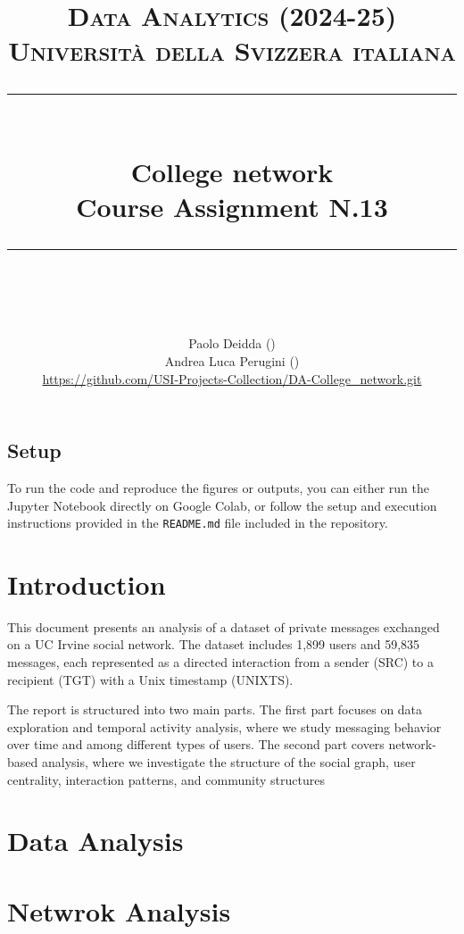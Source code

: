 \documentclass{article}
\title{
	\normalfont\normalsize
	\textsc{Data Analytics (2024-25)\\
	Universit\`a della Svizzera italiana}\\
	\rule{\linewidth}{0.5pt}\\
	{\huge College network\\
	\small Course Assignment N.13}\\
	\rule{\linewidth}{1pt}\\
	\vspace{5pt}
}
\author{
	Paolo Deidda (\text{paolo.deidda@usi.ch}) \\ 
	Andrea Luca Perugini (\text{andrea.perugini@usi.ch})\\
	\url{https://github.com/USI-Projects-Collection/DA-College_network.git}
	}
\begin{document}
\maketitle

\tableofcontents

\vspace{50pt}

\vspace*{\fill}

\subsection*{Setup}

To run the code and reproduce the figures or outputs, you can either run the Jupyter Notebook directly on Google Colab, or follow the setup and execution instructions provided in the \texttt{README.md} file included in the repository.

\section*{Introduction}

This document presents an analysis of a dataset of private messages exchanged on a UC Irvine social network. The dataset includes 1,899 users and 59,835 messages, each represented as a directed interaction from a sender (SRC) to a recipient (TGT) with a Unix timestamp (UNIXTS).

The report is structured into two main parts. The first part focuses on data exploration and temporal activity analysis, where we study messaging behavior over time and among different types of users. The second part covers network-based analysis, where we investigate the structure of the social graph, user centrality, interaction patterns, and community structures
\newpage

\section{Data Analysis}


\newpage

\section{Netwrok Analysis}

\end{document}
